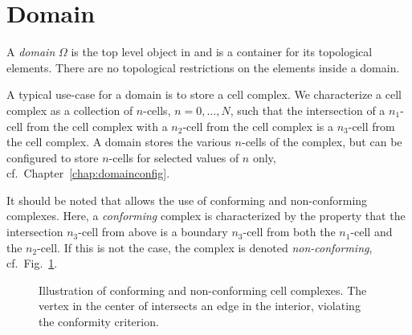 \section{Domain}
A \emph{domain} $\Omega$ is the top level object in {\ViennaGrid} and is a container for its topological elements. There are no topological restrictions on the elements inside a domain. 

A typical use-case for a domain is to store a cell complex. We characterize a cell complex as a collection of $n$-cells, $n=0, \ldots, N$, such that the intersection of a $n_1$-cell from the cell complex with a $n_2$-cell from the cell complex is a $n_3$-cell from the cell complex. A domain stores the various $n$-cells of the complex, but can be configured to store $n$-cells for selected values of $n$ only, cf.~Chapter~\ref{chap:domainconfig}.

It should be noted that {\ViennaGrid} allows the use of conforming and non-conforming complexes. Here, a \emph{conforming} complex is characterized by the property that the intersection $n_3$-cell from above is a boundary $n_3$-cell from both the $n_1$-cell and the $n_2$-cell. If this is not the case, the complex is denoted \emph{non-conforming}, cf.~Fig.~\ref{fig:conformity}.

\begin{figure}[tb]
\centering 
    \hspace*{1cm}
 \caption{Illustration of conforming and non-conforming cell complexes. The vertex in the center of  intersects an edge in the interior, violating the conformity criterion.}
 \label{fig:conformity}
\end{figure}

